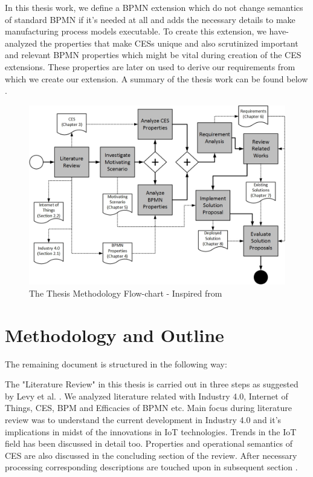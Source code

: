In this thesis work, we define a \acs{BPMN} extension which do not change semantics of standard \acs{BPMN} if it's needed at all and adds the necessary details to make manufacturing process models executable. To create this extension, we have- analyzed the properties that make \acs{CES}s unique and also scrutinized important and relevant \acs{BPMN} properties which might be vital during creation of the \acs{CES} extensions. These properties are later on used to derive our requirements from which we create our extension. A summary of the thesis work can be found below .
\begin{figure}[h!]
	\includegraphics[scale=0.72, angle=90]{./gfx/outline}
	\centering
	\caption{The Thesis Methodology Flow-chart - Inspired from \cite{TIMURTHESIS}}
	\label{fig:1.3}
\end{figure}
\section{Methodology and Outline}
The remaining document is structured in the following way:

The "Literature Review" in this thesis is carried out in three steps as suggested by Levy et al. \cite{LEVYLIT}. We analyzed literature related with Industry 4.0, Internet of Things, \acs{CES}, \acs{BPM} and Efficacies of \acs{BPMN} etc. Main focus during literature review was to understand the current development in Industry 4.0 and it's implications in midst of the innovations in \acs{IoT} technologies. Trends in the \acs{IoT} field has been discussed in detail too. Properties and operational semantics of \acs{CES} are also discussed in the concluding section of the review. After necessary processing corresponding descriptions are touched upon in subsequent section .
  
